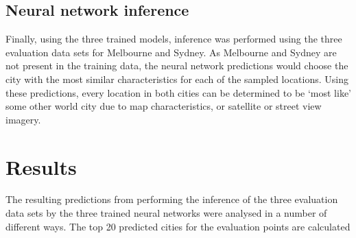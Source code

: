 \documentclass[sageh,times]{sagej}
\begin{document}
%
%
%
%
%



\subsection{Neural network inference}\label{sec:methods5}    
Finally, using the three trained models, inference was performed using the three evaluation data sets for Melbourne and Sydney. As Melbourne and Sydney are not present in the training data, the neural network predictions would choose the city with the most similar characteristics for each of the sampled locations. Using these predictions, every location in both cities can be determined to be `most like' some other world city due to map characteristics, or satellite or street view imagery.





\section{Results}\label{sec:results}
The resulting predictions from performing the inference of the three evaluation data sets by the three trained neural networks were analysed in a number of different ways. The top 20 predicted cities for the evaluation points are calculated 
\end{document}
